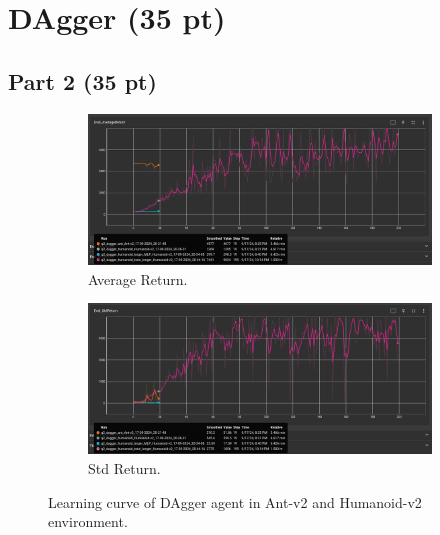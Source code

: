 \documentclass{article}
\begin{document}
\section{DAgger (35 pt)}
\subsection{Part 2 (35 pt)}
\begin{figure}[h!]
  \centering
  \begin{subfigure}[b]{.99\linewidth}
    \centering
    \includegraphics[width=\columnwidth]{figs/DAgger_average_return.png}
    \caption{Average Return.}
  \end{subfigure}
  \begin{subfigure}[b]{.99\linewidth}
    \centering
    \includegraphics[width=\columnwidth]{figs/DAgger_std_return.png}
    \caption{Std Return.}
  \end{subfigure}
  \caption{Learning curve of DAgger agent in Ant-v2 and Humanoid-v2 environment.}
  \label{fig:p5}
\end{figure}
\end{document}
